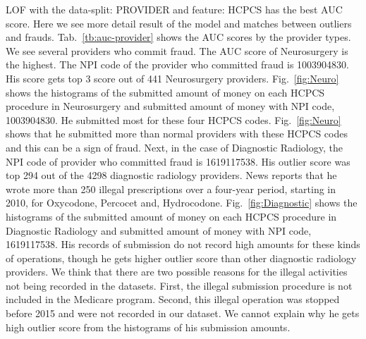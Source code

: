 \documentclass[dvipdfmx, english]{ampmt}             %
\newcommand{\Tabref}[1]{Tab.~\ref{#1}}
\newcommand{\Figref}[1]{Fig.~\ref{#1}}
\begin{document}
LOF with the data-split: PROVIDER and feature: HCPCS has the best AUC score. Here we see more detail result of the model and matches between outliers and frauds.
\Tabref{tb:auc-provider} shows the AUC scores by the provider types. We see several providers who commit fraud. The AUC score of Neurosurgery is the highest. 
The NPI code of the provider who committed fraud is 1003904830. His score gets top 3 score out of 441 Neurosurgery providers. \Figref{fig:Neuro} shows the histograms of the submitted amount of 
money on each HCPCS procedure in Neurosurgery and submitted amount of money with NPI code, 1003904830. He submitted most for these four HCPCS codes.
\Figref{fig:Neuro} shows that he submitted more than normal providers with these HCPCS codes and this can be a sign of fraud. 
Next, in the case of Diagnostic Radiology, the NPI code of provider who committed fraud is 1619117538. His outlier score was top 294 out of the 4298 diagnostic radiology providers.
News reports that he wrote more than 250 illegal prescriptions over a four-year period, starting in 2010, for Oxycodone, Percocet and, Hydrocodone\cite{Diagnostic}. 
\Figref{fig:Diagnostic} shows the histograms of the submitted amount of money on each HCPCS procedure in Diagnostic Radiology and submitted amount of money with NPI code, 1619117538.
His records of submission do not record high amounts for these kinds of operations, though he gets higher outlier score than other diagnostic radiology providers. We think that there are two possible reasons for the illegal activities not being recorded in the datasets.
First, the illegal submission procedure is not included in the Medicare program. Second, this illegal operation was stopped before 2015 and were not recorded in our dataset. We cannot explain why he gets high outlier score from the histograms of his submission amounts.
\par




\end{document}
